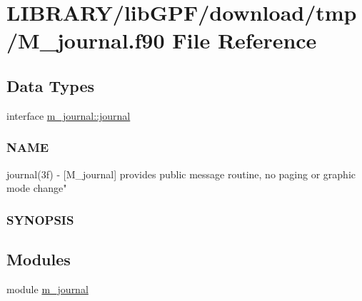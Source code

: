 \hypertarget{M__journal_8f90}{}\section{L\+I\+B\+R\+A\+R\+Y/lib\+G\+P\+F/download/tmp/\+M\+\_\+journal.f90 File Reference}
\label{M__journal_8f90}
\subsection*{Data Types}
\begin{DoxyCompactItemize}
\item 
interface \hyperlink{interfacem__journal_1_1journal}{m\+\_\+journal\+::journal}
\begin{DoxyCompactList}\small\item\em \subsubsection*{N\+A\+ME}

journal(3f) -\/ \mbox{[}M\+\_\+journal\mbox{]} provides public message routine, no paging or graphic mode change" \subsubsection*{S\+Y\+N\+O\+P\+S\+IS}\end{DoxyCompactList}\end{DoxyCompactItemize}
\subsection*{Modules}
\begin{DoxyCompactItemize}
\item 
module \hyperlink{namespacem__journal}{m\+\_\+journal}
\end{DoxyCompactItemize}
